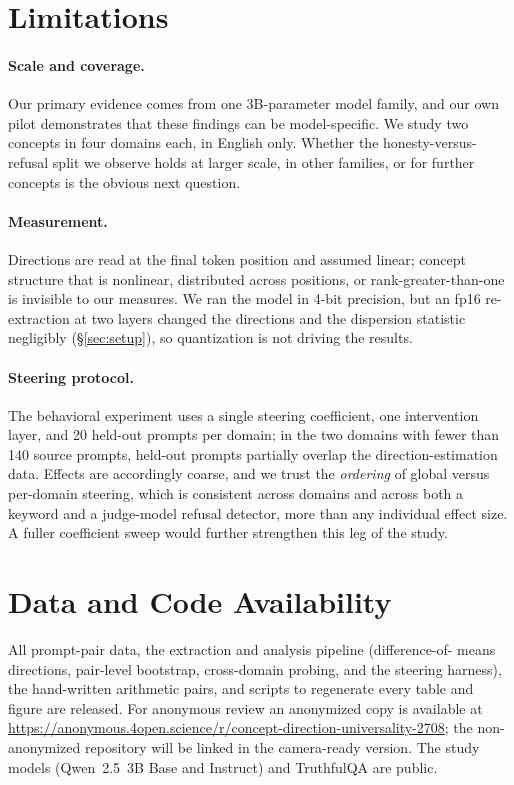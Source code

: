 \documentclass[11pt]{article}
\begin{document}
\section{Limitations}
\label{sec:limitations}

\paragraph{Scale and coverage.}
Our primary evidence comes from one 3B-parameter model family, and our own
pilot demonstrates that these findings can be model-specific. We study two
concepts in four domains each, in English only. Whether the honesty-versus-
refusal split we observe holds at larger scale, in other families, or for
further concepts is the obvious next question.

\paragraph{Measurement.}
Directions are read at the final token position and assumed linear;
concept structure that is nonlinear, distributed across positions, or
rank-greater-than-one is invisible to our measures. We ran the model in
4-bit precision, but an fp16 re-extraction at two layers changed the
directions and the dispersion statistic negligibly
(\S\ref{sec:setup}), so quantization is not driving the results.

\paragraph{Steering protocol.}
The behavioral experiment uses a single steering coefficient, one
intervention layer, and 20 held-out prompts per domain; in the two domains
with fewer than 140 source prompts, held-out prompts partially overlap the
direction-estimation data. Effects are accordingly coarse, and we trust the
\emph{ordering} of global versus per-domain steering, which is consistent
across domains and across both a keyword and a judge-model refusal detector,
more than any individual effect size. A fuller coefficient sweep would
further strengthen this leg of the study.


\section*{Data and Code Availability}

All prompt-pair data, the extraction and analysis pipeline (difference-of-
means directions, pair-level bootstrap, cross-domain probing, and the
steering harness), the hand-written arithmetic pairs, and scripts to
regenerate every table and figure are released. For anonymous review an
anonymized copy is available at
\url{https://anonymous.4open.science/r/concept-direction-universality-2708}; the
non-anonymized repository will be linked in the camera-ready version. The
study models (Qwen~2.5~3B Base and Instruct) and TruthfulQA are public.
\end{document}
